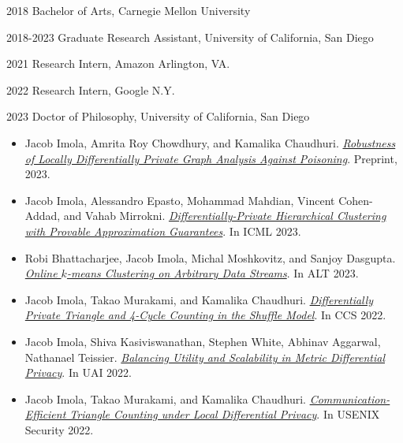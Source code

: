 \documentclass[12pt]{ucsddissertation}
\begin{document}
\begin{vita}
\noindent
\begin{cv}{}
\begin{cvlist}{}
\item[2018] Bachelor of Arts, Carnegie Mellon University
\item[2018-2023] Graduate Research Assistant, University of California, San
Diego
\item[2021] Research Intern, Amazon Arlington, VA.
\item[2022] Research Intern, Google N.Y.
\item[2023] Doctor of Philosophy, University of California, San Diego
\end{cvlist}
\end{cv}

\publications
\begin{itemize}
\item
		Jacob Imola, Amrita Roy Chowdhury, and Kamalika Chaudhuri.
		\textit{\href{https://arxiv.org/pdf/2210.14376.pdf}{Robustness of Locally Differentially Private Graph Analysis Against Poisoning}}. Preprint, 2023.

\item
	Jacob Imola, Alessandro Epasto, Mohammad Mahdian, Vincent Cohen-Addad, and Vahab Mirrokni.
	\textit{\href{https://arxiv.org/abs/2302.00037}{Differentially-Private Hierarchical Clustering with Provable Approximation Guarantees}}. In ICML 2023.

\item
		Robi Bhattacharjee, Jacob Imola, Michal Moshkovitz, and Sanjoy Dasgupta.
		\textit{\href{https://arxiv.org/abs/2102.09101}{Online $k$-means Clustering on Arbitrary Data Streams}}. In ALT 2023.

\item
 Jacob Imola, Takao Murakami, and Kamalika Chaudhuri.
		\textit{\href{https://arxiv.org/abs/2205.01429.pdf}{Differentially Private Triangle and 4-Cycle Counting in the Shuffle Model}}. In CCS 2022.

\item Jacob Imola, Shiva Kasiviswanathan, Stephen White, Abhinav Aggarwal, Nathanael Teissier.
		\textit{\href{https://openreview.net/pdf?id=B0l8-wLjql5}{Balancing Utility and Scalability in Metric Differential Privacy}}. In UAI 2022.

\item Jacob Imola, Takao Murakami, and Kamalika Chaudhuri.
		\textit{\href{https://arxiv.org/abs/2110.06485}{Communication-Efficient Triangle Counting under Local Differential Privacy}}. In USENIX Security 2022.


\end{itemize}
\end{vita}
\end{document}
